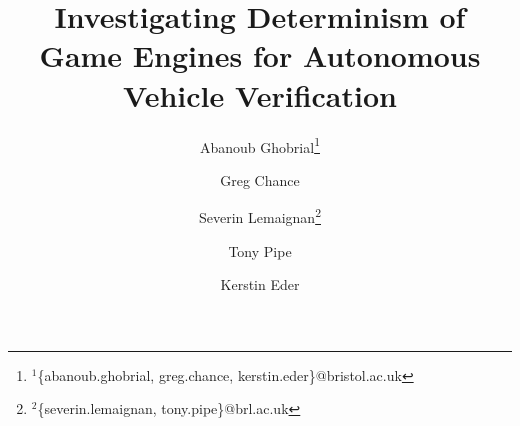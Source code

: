 \documentclass[letterpaper, 10 pt, journal, twoside]{IEEEtran}
\begin{document}
% 
% 
% 
% 
% 
% 
% 

\title{Investigating Determinism of Game Engines for Autonomous Vehicle Verification}
\author[1,3]{Abanoub Ghobrial\thanks{$^{1}${\footnotesize \{abanoub.ghobrial, greg.chance, kerstin.eder\}@bristol.ac.uk}}}
\author[1,3]{Greg Chance}
\author[2,3]{Severin Lemaignan\thanks{$^{2}${\footnotesize \{severin.lemaignan, tony.pipe\}@brl.ac.uk}}}
\author[2,3]{Tony Pipe}
\author[1,3]{Kerstin Eder}
\maketitle
\end{document}
